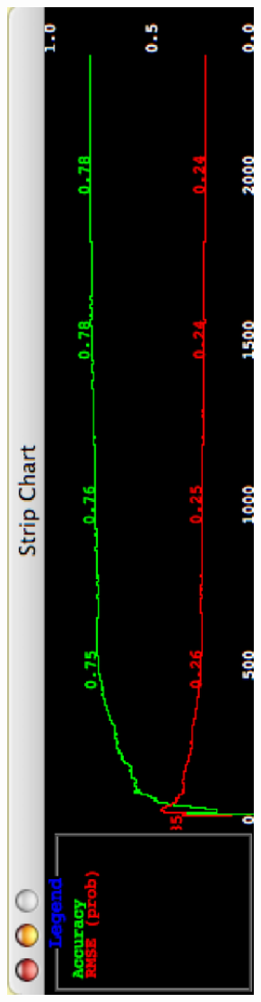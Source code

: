 \documentclass[a4paper]{article}
\begin{document}
\begin{center}
  \includegraphics[angle=270,width=12cm]{images/IncrementalChart.eps}
\end{center}
\end{document}
